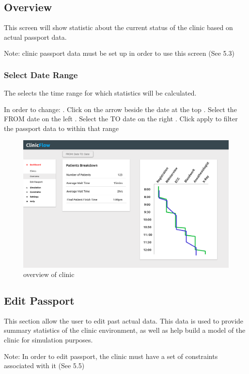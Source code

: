 \documentclass[12pt]{article}
\begin{document}
\subsection{Overview}
This screen will show statistic about the current status of the clinic based on actual passport data.
\medbreak

Note: clinic passport data must be set up in order to use this screen (See 5.3)

\subsubsection{Select Date Range}
The selects the time range for which statistics will be calculated.
\medbreak

In order to change:
. Click on the arrow beside the date at the top
. Select the FROM date on the left
. Select the TO date on the right
. Click apply to filter the passport data to within that range
\pagebreak

\begin{figure}[h!]
\caption{overview of clinic}
\centering
\includegraphics[width=\textwidth]{overview}
\end{figure}

\subsection{Edit Passport}
This section allow the user to edit past actual data. This data is used to provide summary statistics of the clinic environment, as well as help build a model of the clinic for simulation purposes.
\medbreak

Note: In order to edit passport, the clinic must have a set of constraints associated with it (See 5.5)
\medbreak
\end{document}
